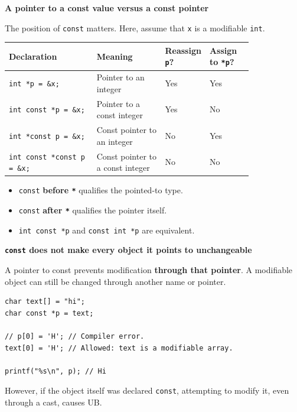 \documentclass[11pt,a4paper]{article}
\begin{document}
\textbf{A pointer to a const value versus a const pointer}

The position of \texttt{const} matters. Here, assume that
\texttt{x} is a modifiable \texttt{int}.

\begin{longtable}{@{}
    >{\raggedright\arraybackslash}p{0.36\linewidth}
    >{\raggedright\arraybackslash}p{0.28\linewidth}
    >{\raggedright\arraybackslash}p{0.18\linewidth}
    >{\raggedright\arraybackslash}p{}@{}}
\toprule
\textbf{Declaration} &
\textbf{Meaning} &
\textbf{Reassign \texttt{p}?} &
\textbf{Assign to \texttt{*p}?} \\
\midrule
\endhead
\bottomrule
\endlastfoot
\texttt{int *p = \&x;}
    & Pointer to an integer
    & Yes & Yes \\
\texttt{int const *p = \&x;}
    & Pointer to a const integer
    & Yes & No \\
\texttt{int *const p = \&x;}
    & Const pointer to an integer
    & No & Yes \\
\texttt{int const *const p = \&x;}
    & Const pointer to a const integer
    & No & No \\
\end{longtable}

\begin{itemize}
    \item \texttt{const} \textbf{before \texttt{*}} qualifies the
          pointed-to type.
    \item \texttt{const} \textbf{after \texttt{*}} qualifies the
          pointer itself.
    \item \texttt{int const *p} and \texttt{const int *p}
          are equivalent.
\end{itemize}

\textbf{\texttt{const} does not make every object it points to
unchangeable}

A pointer to const prevents modification
\textbf{through that pointer}. A modifiable object can still be
changed through another name or pointer.

\begin{lstlisting}[style=cscode]
char text[] = "hi";
char const *p = text;

// p[0] = 'H'; // Compiler error.
text[0] = 'H'; // Allowed: text is a modifiable array.

printf("%s\n", p); // Hi
\end{lstlisting}

However, if the object itself was declared \texttt{const},
attempting to modify it, even through a cast, causes UB.
\end{document}
